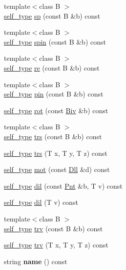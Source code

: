 \begin{DoxyCompactItemize}
\item 
{\footnotesize template$<$class B $>$ }\\\hyperlink{classvsr_1_1_m_v}{self\-\_\-type} \hyperlink{classvsr_1_1_m_v_a8388d5c43d168da18f5069e42827bc39}{sp} (const B \&b) const 
\item 
{\footnotesize template$<$class B $>$ }\\\hyperlink{classvsr_1_1_m_v}{self\-\_\-type} \hyperlink{classvsr_1_1_m_v_a15a58766481912ef3d99fef1290b04d5}{spin} (const B \&b) const 
\item 
{\footnotesize template$<$class B $>$ }\\\hyperlink{classvsr_1_1_m_v}{self\-\_\-type} \hyperlink{classvsr_1_1_m_v_add2ff2e4e8cd2a6741f62bddc96df04b}{re} (const B \&b) const 
\item 
{\footnotesize template$<$class B $>$ }\\\hyperlink{classvsr_1_1_m_v}{self\-\_\-type} \hyperlink{classvsr_1_1_m_v_a430bdc60dd2e98d7c45d2bf57164fdf1}{pin} (const B \&b) const 
\item 
\hyperlink{classvsr_1_1_m_v}{self\-\_\-type} \hyperlink{classvsr_1_1_m_v_afb4a145a301a9782f4715733d1712b3d}{rot} (const \hyperlink{namespacevsr_ab2f5aee828c6c805b8a86a5b077d192c}{Biv} \&b) const 
\item 
{\footnotesize template$<$class B $>$ }\\\hyperlink{classvsr_1_1_m_v}{self\-\_\-type} \hyperlink{classvsr_1_1_m_v_aefce51dd1e627279586125c5cf9ebf93}{trs} (const B \&b) const 
\item 
\hyperlink{classvsr_1_1_m_v}{self\-\_\-type} \hyperlink{classvsr_1_1_m_v_a30a32766db8d44f5dd98e9f9116e5a61}{trs} (T x, T y, T z) const 
\item 
\hyperlink{classvsr_1_1_m_v}{self\-\_\-type} \hyperlink{classvsr_1_1_m_v_a8c9c6955ff6dec304b16ed2f42944a8d}{mot} (const \hyperlink{namespacevsr_a6c6892b7aec25cfb16492501e2e35b11}{Dll} \&d) const 
\item 
\hyperlink{classvsr_1_1_m_v}{self\-\_\-type} \hyperlink{classvsr_1_1_m_v_a053e0ce09e41e73089b4365e732faf9a}{dil} (const \hyperlink{namespacevsr_a2d05beb9721c5d9211b479af6d47222d}{Pnt} \&b, T v) const 
\item 
\hyperlink{classvsr_1_1_m_v}{self\-\_\-type} \hyperlink{classvsr_1_1_m_v_ab528a1aa8fae773433c92ef89aadce50}{dil} (T v) const 
\item 
{\footnotesize template$<$class B $>$ }\\\hyperlink{classvsr_1_1_m_v}{self\-\_\-type} \hyperlink{classvsr_1_1_m_v_a0886edb7b6f457e5eeb8d4738adaa52d}{trv} (const B \&b) const 
\item 
\hyperlink{classvsr_1_1_m_v}{self\-\_\-type} \hyperlink{classvsr_1_1_m_v_a5d549b202fe8bef955ea9f283dff1966}{trv} (T x, T y, T z) const 
\item 
\hypertarget{classvsr_1_1_m_v_abe10894ac7e4af83218fa70c16c04e4d}{string {\bfseries name} () const }\label{classvsr_1_1_m_v_abe10894ac7e4af83218fa70c16c04e4d}


\end{DoxyCompactItemize}
